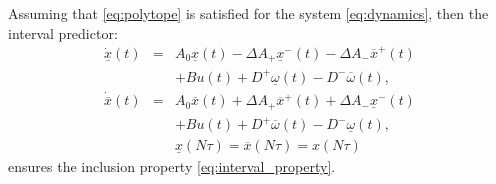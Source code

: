 \documentclass{article}
\begin{document}
\begin{theorem}
\label{thm:predictor}
Assuming that \eqref{eq:polytope} is satisfied for the system \eqref{eq:dynamics}, then the interval predictor:
\begin{eqnarray}
\dot{\underline{x}}(t) & = & A_{0}\underline{x}(t)-\Delta A_{+}\underline{x}^{-}(t)-\Delta A_{-}\overline{x}^{+}(t)\nonumber \\
 &  & +Bu(t)+D^{+}\underline{\omega}(t)-D^{-}\overline{\omega}(t),\nonumber\\
\dot{\overline{x}}(t) & = & A_{0}\overline{x}(t)+\Delta A_{+}\overline{x}^{+}(t)+\Delta A_{-}\underline{x}^{-}(t) \label{eq:interval_predictor} \\
 &  & +Bu(t)+D^{+}\overline{\omega}(t)-D^{-}\underline{\omega}(t),\nonumber \\
 &  & \underline{x}(N\tau)=\overline{x}(N\tau)={x}(N\tau)\nonumber 
\end{eqnarray}
ensures the inclusion property \eqref{eq:interval_property}.


\end{theorem}
\end{document}
